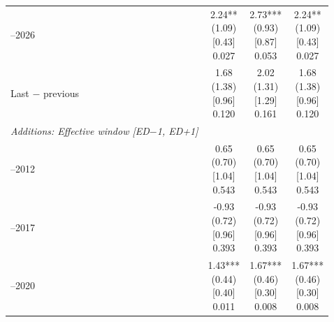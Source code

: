 \begin{threeparttable}
\begin{tabular}{@{}lccc}
\addlinespace[0.25ex]
\addlinespace[0.25ex]
2024–2026 & \makecell{2.24**\\(1.09)\\{}[0.43]\\{0.027}} & \makecell{2.73***\\(0.93)\\{}[0.87]\\{0.053}} & \makecell{2.24**\\(1.09)\\{}[0.43]\\{0.027}} \\
\addlinespace[0.25ex]
\addlinespace[0.25ex]
Last $-$ previous & \makecell{1.68\\(1.38)\\{}[0.96]\\{0.120}} & \makecell{2.02\\(1.31)\\{}[1.29]\\{0.161}} & \makecell{1.68\\(1.38)\\{}[0.96]\\{0.120}} \\
\addlinespace[0.25ex]
\midrule
\emph{Additions: Effective window [ED$-$1, ED+1]} \\
\addlinespace[0.25ex]
\addlinespace[1ex]
2007–2012 & \makecell{0.65\\(0.70)\\{}[1.04]\\{0.543}} & \makecell{0.65\\(0.70)\\{}[1.04]\\{0.543}} & \makecell{0.65\\(0.70)\\{}[1.04]\\{0.543}} \\
\addlinespace[0.25ex]
\addlinespace[0.25ex]
2013–2017 & \makecell{-0.93\\(0.72)\\{}[0.96]\\{0.393}} & \makecell{-0.93\\(0.72)\\{}[0.96]\\{0.393}} & \makecell{-0.93\\(0.72)\\{}[0.96]\\{0.393}} \\
\addlinespace[0.25ex]
\addlinespace[0.25ex]
2018–2020 & \makecell{1.43***\\(0.44)\\{}[0.40]\\{0.011}} & \makecell{1.67***\\(0.46)\\{}[0.30]\\{0.008}} & \makecell{1.67***\\(0.46)\\{}[0.30]\\{0.008}} \\

\end{tabular}
\end{threeparttable}
